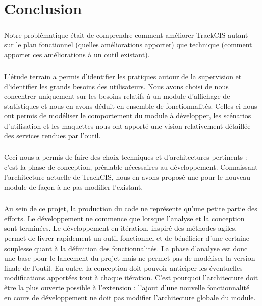 \chapter*{Conclusion}
	\paragraph{}
	Notre problématique était de comprendre comment améliorer TrackCIS autant sur
	le plan fonctionnel (quelles améliorations apporter) que technique (comment
	apporter ces améliorations à un outil existant).
	
	\paragraph{}%
	L'étude terrain a permis d'identifier les pratiques autour de la supervision et
	d'identifier les grands besoins des utilisateurs. Nous avons choisi de nous
	concentrer uniquement sur les besoins relatifs à un module d'affichage de
	statistiques et nous en avons déduit en ensemble de fonctionnalités. Celles-ci
	nous ont permis de modéliser le comportement du module à développer, les
	scénarios d'utilisation et les maquettes nous ont apporté une vision
	relativement détaillée des services rendues par l'outil.
	
	\paragraph{}%
	Ceci nous a permis de faire des choix techniques et
	d'architectures pertinents : c'est la phase de
	conception, préalable nécessaires au développement.
	Connaissant l'architecture actuelle de
	TrackCIS, nous en avons proposé une pour le nouveau module de façon à ne pas
	modifier l'existant.
	
	\paragraph{}%
	Au sein de ce projet, la production du code ne représente qu'une petite
	partie des efforts. Le développement ne commence que lorsque l'analyse et la
	conception sont terminées. Le développement en itération, inspiré des
	méthodes agiles, permet de livrer rapidement un outil fonctionnel et de
	bénéficier d'une certaine souplesse quant à la définition des fonctionnalités.
	La phase d'analyse est donc une base pour le lancement du projet mais ne
	permet pas de modéliser la version finale de l'outil. En outre, la
	conception doit pouvoir anticiper les éventuelles modifications apportées tout
	à chaque itération. C'est pourquoi l'architecture doit être la plus ouverte
	possible à l'extension :
	l'ajout d'une nouvelle fonctionnalité en cours de développement ne doit pas
	modifier l'architecture globale du module.
	
